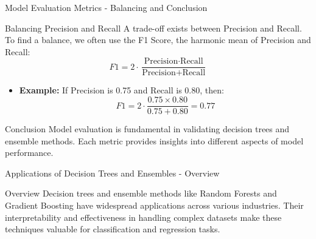 \documentclass[aspectratio=169]{beamer}
\begin{document}
\begin{frame}[fragile]{Model Evaluation Metrics - Balancing and Conclusion}
    \begin{block}{Balancing Precision and Recall}
        A trade-off exists between Precision and Recall. To find a balance, we often use the F1 Score, the harmonic mean of Precision and Recall:
        \begin{equation}
            F1 = 2 \cdot \frac{\text{Precision} \cdot \text{Recall}}{\text{Precision} + \text{Recall}}
        \end{equation}
        \begin{itemize}
            \item \textbf{Example:} If Precision is 0.75 and Recall is 0.80, then:
            \begin{equation}
                F1 = 2 \cdot \frac{0.75 \times 0.80}{0.75 + 0.80} = 0.77
            \end{equation}
        \end{itemize}
    \end{block}
    
    \begin{block}{Conclusion}
        Model evaluation is fundamental in validating decision trees and ensemble methods. Each metric provides insights into different aspects of model performance.
    \end{block}
\end{frame}

\begin{frame}[fragile]{Applications of Decision Trees and Ensembles - Overview}
    \begin{block}{Overview}
        Decision trees and ensemble methods like Random Forests and Gradient Boosting have widespread applications across various industries. Their interpretability and effectiveness in handling complex datasets make these techniques valuable for classification and regression tasks.
    \end{block}
\end{frame}
\end{document}
